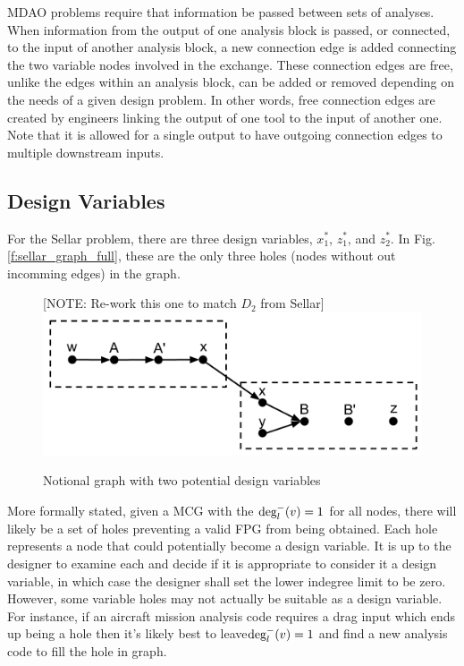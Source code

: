 MDAO problems require that information be passed between sets of analyses. When 
information from the output of one analysis block is passed, or connected, to the 
input of another analysis block, a new connection edge is added connecting the two 
variable nodes involved in the exchange. These connection edges are free, unlike the edges 
within an analysis block, can be added or removed depending on the needs
of a given design problem. In other words, free connection edges are created by 
engineers linking the output of one tool to the input of another one. Note that 
it is allowed for a single output to have outgoing connection edges to multiple 
downstream inputs. 

\subsection{Design Variables}
For the Sellar problem, there are three design variables, $x_1^*$, $z_1^*$, and $z_2^*$. In Fig. 
\ref{f:sellar_graph_full}, these are the only three holes (nodes without out 
incomming edges) in the graph. 

\begin{figure}[htb!]
  \begin{center}
  [NOTE: Re-work this one to match $D_2$ from Sellar]
    \includegraphics[width=.6\textwidth]{images/design_vars_graph}
  \end{center}
  \caption{Notional graph with two potential design variables \label{f:designvars}}
\end{figure}

More formally stated, given a MCG with the $\textrm{deg}_l^-(v)=1$ for all nodes, 
there will likely be a set of holes preventing a valid FPG from being obtained. 
Each hole represents a node that could potentially become a design variable. 
It is up to the designer to examine each and decide if it is appropriate to 
consider it a design variable, in which case the designer shall set the lower 
indegree limit to be zero. However, some variable holes may not actually be 
suitable as a design variable. For instance, if an aircraft mission analysis 
code requires a drag input which ends up being a hole then it's likely best to 
leave$\textrm{deg}_l^-(v)=1$ and find a new analysis code to fill the hole in graph. 

